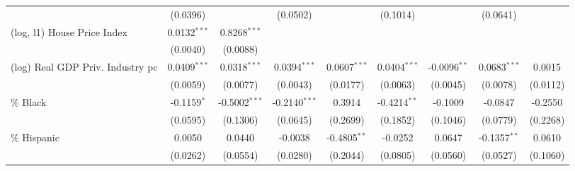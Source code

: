 \documentclass[
  10pt,
]{article}
\begin{document}
\begin{table}[htbp]
\begin{adjustbox}{max width=\linewidth}
\begin{tabular}{lcccccccc}
                                                        & (0.0396)            &                         & (0.0502)            &                       & (0.1014)               &                                       & (0.0641)               &   \\   
         (log, l1) House Price Index                    & 0.0132$^{***}$      & 0.8268$^{***}$          &                     &                       &                        &                                       &                        &   \\   
                                                        & (0.0040)            & (0.0088)                &                     &                       &                        &                                       &                        &   \\   
         (log) Real GDP Priv. Industry pc               & 0.0409$^{***}$      & 0.0318$^{***}$          & 0.0394$^{***}$      & 0.0607$^{***}$        & 0.0404$^{***}$         & -0.0096$^{**}$                        & 0.0683$^{***}$         & 0.0015\\   
                                                        & (0.0059)            & (0.0077)                & (0.0043)            & (0.0177)              & (0.0063)               & (0.0045)                              & (0.0078)               & (0.0112)\\   
         \% Black                                       & -0.1159$^{*}$       & -0.5002$^{***}$         & -0.2140$^{***}$     & 0.3914                & -0.4214$^{**}$         & -0.1009                               & -0.0847                & -0.2550\\   
                                                        & (0.0595)            & (0.1306)                & (0.0645)            & (0.2699)              & (0.1852)               & (0.1046)                              & (0.0779)               & (0.2268)\\   
         \% Hispanic                                    & 0.0050              & 0.0440                  & -0.0038             & -0.4805$^{**}$        & -0.0252                & 0.0647                                & -0.1357$^{**}$         & 0.0610\\   
                                                        & (0.0262)            & (0.0554)                & (0.0280)            & (0.2044)              & (0.0805)               & (0.0560)                              & (0.0527)               & (0.1060)\\   

\end{tabular}
\end{adjustbox}
\end{table}
\end{document}
